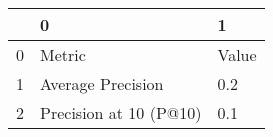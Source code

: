 \begin{tabular}{lll}
\toprule
{} &                       0 &      1 \\
\midrule
0 &                  Metric &  Value \\
1 &       Average Precision &    0.2 \\
2 &  Precision at 10 (P@10) &    0.1 \\
\bottomrule
\end{tabular}
